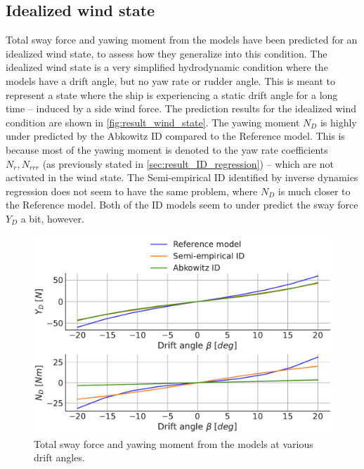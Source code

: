 \subsection{Idealized wind state}
Total sway force and yawing moment from the models have been predicted for an idealized wind state, to assess how they generalize into this condition.
The idealized wind state is a very simplified hydrodynamic condition where the models have a drift angle, but no yaw rate or rudder angle. This is meant to represent a state where the ship is experiencing a static drift angle for a long time -- induced by a side wind force.
The prediction results for the idealized wind condition are shown in \autoref{fig:result_wind_state}. The yawing moment $N_D$ is highly under predicted by the Abkowitz ID compared to the Reference model. This is because most of the yawing moment is denoted to the yaw rate coefficients $N_r,N_{rrr}$ (as previously stated in \autoref{sec:result_ID_regression}) -- which are not activated in the wind state. The Semi-empirical ID identified by inverse dynamics regression does not seem to have the same problem, where $N_D$ is much closer to the Reference model. Both of the ID models seem to under predict the sway force $Y_D$ a bit, however.
\label{sec:wind_state}
\begin{figure}[h!]
    \includegraphics[width=\columnwidth]{figures/result_wind_state.forces.pdf}
    \caption{Total sway force and yawing moment from the models at various drift angles.}
    \label{fig:result_wind_state}
\end{figure}